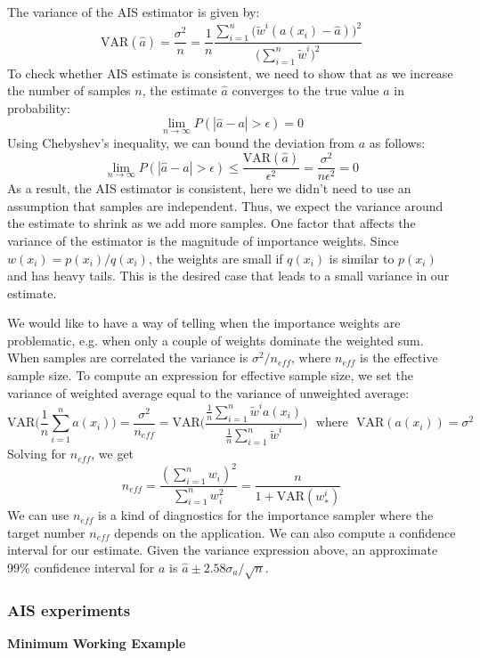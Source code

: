 The variance of the AIS estimator is given by:
\begin{equation}
    \mathrm{VAR}(\hat{a}) = \frac{\sigma^2}{n} = \frac{1}{n}\frac{\sum_{i=1}^{n}\bigg(\tilde{w}^{i}(a(x_i) - \hat{a}) \bigg)^{2}}{\bigg(\sum_{i=1}^{n}\tilde{w}^{i}\bigg)^{2}}
\end{equation}
To check whether AIS estimate is consistent, we need to show that as we increase the number of samples $n$, the estimate $\hat{a}$ converges to the true value $a$ in probability:
\begin{equation}
    \lim_{n\rightarrow \infty} P(|\hat{a} - a| > \epsilon) = 0
\end{equation}
Using Chebyshev's inequality, we can bound the deviation from $a$ as follows:
\begin{equation}
    \lim_{n\rightarrow \infty} P(|\hat{a} - a| > \epsilon) \leq \frac{\mathrm{VAR}(\hat{a})}{\epsilon^2} = \frac{\sigma^2}{n \epsilon^2} = 0
\end{equation}
As a result, the AIS estimator is consistent, here we didn't need to use an assumption that samples are independent. Thus, we expect the variance around the estimate to shrink as we add more samples. One factor that affects the variance of the estimator is the magnitude of importance weights. Since $w(x_i) = p(x_i)/q(x_i)$, the weights are small if $q(x_i)$ is similar to $p(x_i)$ and has heavy tails. This is the desired case that leads to a small variance in our estimate. 

We would like to have a way of telling when the importance weights are problematic, e.g. when only a couple of weights dominate the weighted sum. When samples are correlated the variance is $\sigma^2 / n_{eff}$, where $n_{eff}$ is the effective sample size. To compute an expression for effective sample size, we set the variance of weighted average equal to the variance of unweighted average:
\begin{equation}
    \mathrm{VAR}\bigg(\frac{1}{n}\sum_{i=1}^{n}a(x_i)\bigg) = \frac{\sigma^2}{n_{eff}} = \mathrm{VAR}\bigg(\frac{\frac{1}{n}\sum_{i=1}^{n}\tilde{w}^ia(x_i)}{\frac{1}{n}\sum_{i=1}^{n}\tilde{w}^{i}}\bigg)~~~\mathrm{where}~~~\mathrm{VAR}(a(x_i)) = \sigma^2
\end{equation}
Solving for $n_{eff}$, we get
\begin{equation}
    n_{eff} = \frac{(\sum_{i=1}^{n}w_i)^2}{\sum_{i=1}^{n}w_{i}^{2}} = \frac{n}{1 + \mathrm{VAR}(w_{\ast}^{i})} 
\end{equation}
We can use $n_{eff}$ is a kind of diagnostics for the importance sampler where the target number $n_{eff}$ depends on the application. We can also compute a confidence interval for our estimate. Given the variance expression above, an approximate 99\% confidence interval for $a$ is $\hat{a} \pm 2.58 \sigma_a / \sqrt{n}$.\\

\subsubsection{AIS experiments}

\textbf{Minimum Working Example}





